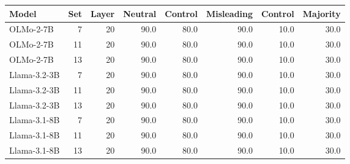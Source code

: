 \begin{tabular}{@{}lrrrrrrr@{}}
\toprule
Model & Set & Layer & Neutral & Control & Misleading & Control & Majority \\
\midrule
OLMo-2-7B & 7 & 20 & 90.0 & 80.0 & 90.0 & 10.0 & 30.0 \\
OLMo-2-7B & 11 & 20 & 90.0 & 80.0 & 90.0 & 10.0 & 30.0 \\
OLMo-2-7B & 13 & 20 & 90.0 & 80.0 & 90.0 & 10.0 & 30.0 \\
Llama-3.2-3B & 7 & 20 & 90.0 & 80.0 & 90.0 & 10.0 & 30.0 \\
Llama-3.2-3B & 11 & 20 & 90.0 & 80.0 & 90.0 & 10.0 & 30.0 \\
Llama-3.2-3B & 13 & 20 & 90.0 & 80.0 & 90.0 & 10.0 & 30.0 \\
Llama-3.1-8B & 7 & 20 & 90.0 & 80.0 & 90.0 & 10.0 & 30.0 \\
Llama-3.1-8B & 11 & 20 & 90.0 & 80.0 & 90.0 & 10.0 & 30.0 \\
Llama-3.1-8B & 13 & 20 & 90.0 & 80.0 & 90.0 & 10.0 & 30.0 \\
\bottomrule
\end{tabular}
